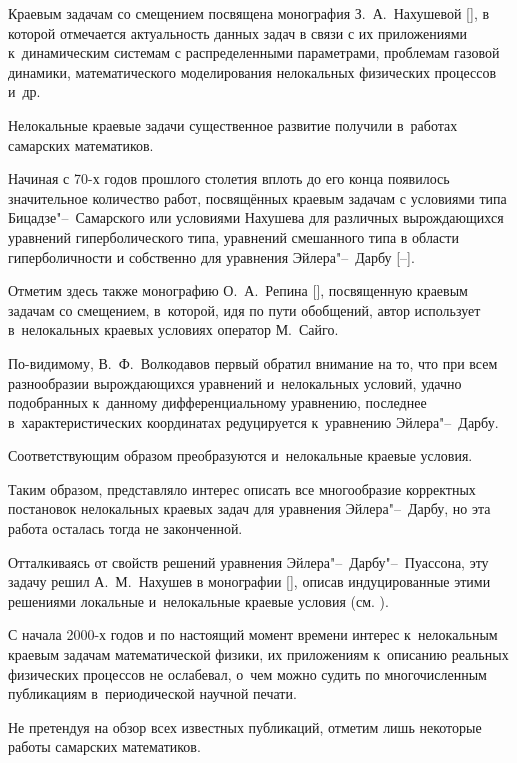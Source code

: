 Краевым задачам со смещением посвящена монография З.~А.~Нахушевой [], в которой отмечается актуальность данных задач в связи с их приложениями к~динамическим системам с распределенными параметрами, проблемам газовой динамики, математического моделирования нелокальных физических процессов и~др. 



Нелокальные краевые задачи существенное развитие получили в~работах самарских математиков.

Начиная с 70-х годов прошлого столетия вплоть до его конца появилось значительное количество работ, посвящённых краевым задачам с условиями типа Бицадзе"--~Самарского или условиями Нахушева для различных вырождающихся уравнений гиперболического типа, уравнений смешанного типа в области гиперболичности и собственно для уравнения Эйлера"--~Дарбу [--]. 

Отметим здесь также монографию О.~А.~Репина [], посвященную краевым задачам со смещением, в~которой, идя по пути обобщений, автор использует в~нелокальных краевых условиях оператор М.~Сайго.

 

По-видимому, В.~Ф.~Волкодавов первый обратил внимание на то, что при всем разнообразии вырождающихся уравнений и~нелокальных условий, удачно подобранных к~данному дифференциальному уравнению, последнее в~характеристических координатах редуцируется к~уравнению Эйлера"--~Дарбу. 

Соответствующим образом преобразуются и~нелокальные краевые условия. 

Таким образом, представляло интерес описать все многообразие корректных постановок нелокальных краевых задач для уравнения Эйлера"--~Дарбу, но эта работа осталась тогда не законченной. 

Отталкиваясь от свойств решений уравнения Эйлера"--~Дарбу"--~Пуассона, эту задачу решил А.~М.~Нахушев в монографии [], описав индуцированные этими решениями локальные и~нелокальные краевые условия (см. \cite[раздел 7 на с.~175]{dolg:13:new}).



С начала 2000-х годов и по настоящий момент времени интерес к~нелокальным краевым задачам математической физики, их приложениям к~описанию реальных физических процессов не ослабевал, о~чем можно судить по многочисленным публикациям в~периодической научной печати. 

Не претендуя на обзор всех известных публикаций, отметим лишь некоторые работы самарских математиков. 

